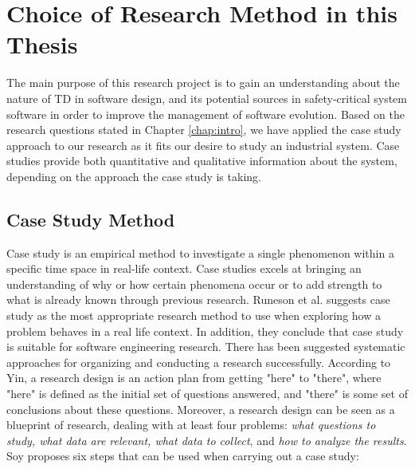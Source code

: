 \section{Choice of Research Method in this Thesis}
\label{sec:choiceofmethod}
The main purpose of this research project is to gain an understanding about the nature of TD in software design, and its potential sources in safety-critical system software in order to improve the management of software evolution. Based on the research questions stated in Chapter \ref{chap:intro}, we have applied the case study approach to our research as it fits our desire to study an industrial system. Case studies provide both quantitative and qualitative information about the system\cite{Oates:2006:RIS:1202299}, depending on the approach the case study is taking.


\subsection{Case Study Method}
\label{subsec:casestudymethod}
Case study is an empirical method to investigate a single phenomenon within a specific time space in real-life context\cite{Wohlin:2000:ESE:330775}. Case studies excels at bringing an understanding of why or how certain phenomena occur or to add strength to what is already known through previous research\cite{Wohlin:2000:ESE:330775,soysusan}. Runeson et al.\cite{Runeson:2009:GCR:1519313.1519324} suggests case study as the most appropriate research method to use when exploring how a problem behaves in a real life context. In addition, they conclude that case study is suitable for software engineering research. There has been suggested systematic approaches for organizing and conducting a research successfully\cite{soysusan,Runeson:2009:GCR:1519313.1519324}. According to Yin\cite{yin2003case}, a research design is an action plan from getting "here" to "there", where "here" is defined as the initial set of questions answered, and "there" is some set of conclusions about these questions. Moreover, a research design can be seen as a blueprint of research, dealing with at least four problems: \textit{what questions to study, what data are relevant, what data to collect}, and \textit{how to analyze the results}\cite{yin2003case}. Soy\cite{soysusan} proposes six steps that can be used when carrying out a case study:

